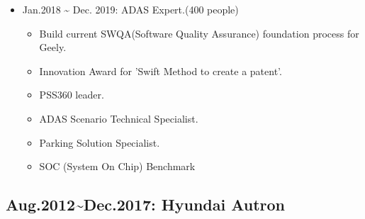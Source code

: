 \documentclass[12pt,a4paper]{article}
\begin{document}
\begin{itemize}
\item Jan.2018 {\textasciitilde} Dec. 2019: ADAS Expert.(400 people)

\begin{itemize}
\item Build current SWQA(Software Quality Assurance) foundation process for Geely.


\item Innovation Award for 'Swift Method to create a patent'.


\item PSS360 leader.


\item ADAS Scenario Technical Specialist.


\item Parking Solution Specialist.


\item SOC (System On Chip) Benchmark

\end{itemize}
\end{itemize}
\subsection{Aug.2012{\textasciitilde}Dec.2017: Hyundai Autron}
\end{document}
